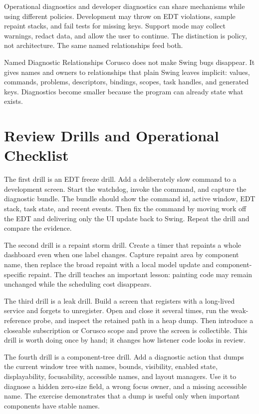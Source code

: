 Operational diagnostics and developer diagnostics can share mechanisms while using different policies. Development may throw on EDT violations, sample repaint stacks, and fail tests for missing keys. Support mode may collect warnings, redact data, and allow the user to continue. The distinction is policy, not architecture. The same named relationships feed both.

\begin{coruscobox}{Named Diagnostic Relationships}
Corusco does not make Swing bugs disappear. It gives names and owners to relationships that plain Swing leaves implicit: values, commands, problems, descriptors, bindings, scopes, task handles, and generated keys. Diagnostics become smaller because the program can already state what exists.
\end{coruscobox}

\section{Review Drills and Operational Checklist}

The first drill is an EDT freeze drill. Add a deliberately slow command to a development screen. Start the watchdog, invoke the command, and capture the diagnostic bundle. The bundle should show the command id, active window, EDT stack, task state, and recent events. Then fix the command by moving work off the EDT and delivering only the UI update back to Swing. Repeat the drill and compare the evidence.

The second drill is a repaint storm drill. Create a timer that repaints a whole dashboard even when one label changes. Capture repaint area by component name, then replace the broad repaint with a local model update and component-specific repaint. The drill teaches an important lesson: painting code may remain unchanged while the scheduling cost disappears.

The third drill is a leak drill. Build a screen that registers with a long-lived service and forgets to unregister. Open and close it several times, run the weak-reference probe, and inspect the retained path in a heap dump. Then introduce a closeable subscription or Corusco scope and prove the screen is collectible. This drill is worth doing once by hand; it changes how listener code looks in review.

The fourth drill is a component-tree drill. Add a diagnostic action that dumps the current window tree with names, bounds, visibility, enabled state, displayability, focusability, accessible names, and layout managers. Use it to diagnose a hidden zero-size field, a wrong focus owner, and a missing accessible name. The exercise demonstrates that a dump is useful only when important components have stable names.

